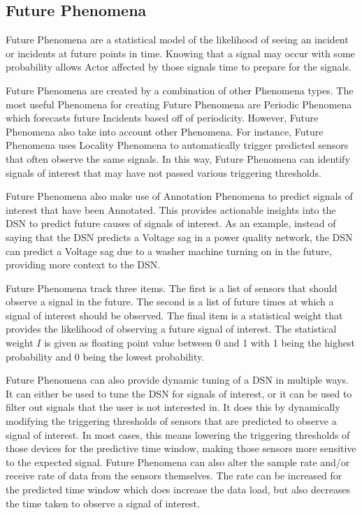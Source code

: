 \subsection{Future Phenomena}\label{subsec:future-phenomena}
Future Phenomena are a statistical model of the likelihood of seeing an incident or incidents at future points in time. Knowing that a signal may occur with some probability allows Actor affected by those signals time to prepare for the signals.

Future Phenomena are created by a combination of other Phenomena types. The most useful Phenomena for creating Future Phenomena are Periodic Phenomena which forecasts future Incidents based off of periodicity. However, Future Phenomena also take into account other Phenomena. For instance, Future Phenomena uses Locality Phenomena to automatically trigger predicted sensors that often observe the same signals. In this way, Future Phenomena can identify signals of interest that may have not passed various triggering thresholds.

Future Phenomena also make use of Annotation Phenomena to predict signals of interest that have been Annotated. This provides actionable insights into the DSN to predict future causes of signals of interest. As an example, instead of saying that the DSN predicts a Voltage sag in a power quality network, the DSN can predict a Voltage sag due to a washer machine turning on in the future, providing more context to the DSN\@.

Future Phenomena track three items. The first is a list of sensors that should observe a signal in the future. The second is a list of future times at which a signal of interest should be observed. The final item is a statistical weight that provides the likelihood of observing a future signal of interest. The statistical weight $I$ is given as floating point value between 0 and 1 with 1 being the highest probability and 0 being the lowest probability.

Future Phenomena can also provide dynamic tuning of a DSN in multiple ways. It can either be used to tune the DSN for signals of interest, or it can be used to filter out signals that the user is not interested in. It does this by dynamically modifying the triggering thresholds of sensors that are predicted to observe a signal of interest. In most cases, this means lowering the triggering thresholds of those devices for the predictive time window, making those sensors more sensitive to the expected signal. Future Phenomena can also alter the sample rate and/or receive rate of data from the sensors themselves. The rate can be increased for the predicted time window which does increase the data load, but also decreases the time taken to observe a signal of interest.

